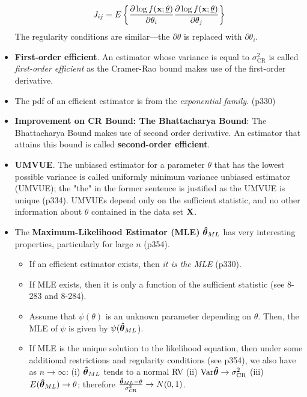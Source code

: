 \documentclass[a4paper]{book}
\begin{document}
\begin{itemize}
\begin{equation}
J_{ij} = E\left\{ \frac{\partial \log f(\mathbf{x}; \underline{\theta})}{\partial \theta_i}\frac{\partial \log f(\mathbf{x}; \underline{\theta})}{\partial \theta_j} \right\}
\end{equation}
The regularity conditions are similar\----the $\partial \theta$ is replaced with $\partial \theta_i$.
\item \textbf{First-order efficient}. An estimator whose variance is equal to $\sigma_{\text{CR}}^2$ is called \textit{first-order efficient} as the Cramer-Rao bound makes use of the first-order derivative.
\item The pdf of an efficient estimator is from the \textit{exponential family}.  (p330)
\item \textbf{Improvement on CR Bound: The Bhattacharya Bound}: The Bhattacharya Bound makes use of second order derivative. An estimator that attains this bound is called \textbf{second-order efficient}.
\item \textbf{UMVUE}. The unbiased estimator for a parameter $\theta$ that has the lowest possible variance is called uniformly minimum variance unbiased estimator (UMVUE); the "the" in the former sentence is justified as the UMVUE is unique (p334). UMVUEs depend only on the sufficient statistic, and no other information about $\theta$ contained in the data set $\mathbf{X}$. 
\item The \textbf{Maximum-Likelihood Estimator (MLE)} $\boldsymbol{\hat{\theta}}_{ML}$ has very interesting properties, particularly for large $n$ (p354).
	\begin{itemize}
	\item If an efficient estimator exists, then \textit{it is the MLE} (p330). 
	\item If MLE exists, then it is only a function of the sufficient statistic (see 8-283 and 8-284).
	\item Assume that $\psi(\theta)$ is an unknown parameter depending on $\theta$. Then, the MLE of $\psi$ is given by $\psi(\boldsymbol{\hat{\theta}}_{ML}$).
	\item If MLE is the unique solution to the likelihood equation, then under some additional restrictions and regularity conditions (see p354), we also have as $n\to \infty$: (i) $\boldsymbol{\hat{\theta}}_{ML}$ tends to a normal RV (ii) $\text{Var}{\boldsymbol{\hat{\theta}}} \to \sigma^2_{\text{CR}}$ (iii) $E(\boldsymbol{\hat{\theta}}_{ML}) \to \theta$; therefore $\frac{\boldsymbol{\hat{\theta}}_{ML}-\theta}{\sigma^2_{\text{CR}}}\to N(0,1)$. 
	\end{itemize}
\end{itemize}
\end{document}
